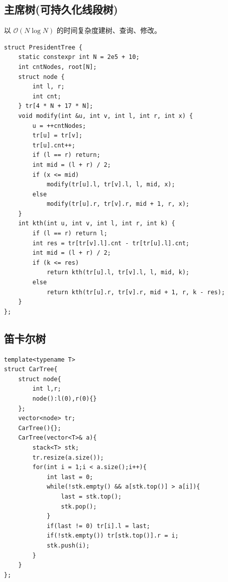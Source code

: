 \subsection{主席树(可持久化线段树)}
以 $\mathcal O(N\log N)$ 的时间复杂度建树、查询、修改。
\begin{lstlisting}[caption={}]
struct PresidentTree {
    static constexpr int N = 2e5 + 10;
    int cntNodes, root[N];
    struct node {
        int l, r;
        int cnt;
    } tr[4 * N + 17 * N];
    void modify(int &u, int v, int l, int r, int x) {
        u = ++cntNodes;
        tr[u] = tr[v];
        tr[u].cnt++;
        if (l == r) return;
        int mid = (l + r) / 2;
        if (x <= mid)
            modify(tr[u].l, tr[v].l, l, mid, x);
        else
            modify(tr[u].r, tr[v].r, mid + 1, r, x);
    }
    int kth(int u, int v, int l, int r, int k) {
        if (l == r) return l;
        int res = tr[tr[v].l].cnt - tr[tr[u].l].cnt;
        int mid = (l + r) / 2;
        if (k <= res)
            return kth(tr[u].l, tr[v].l, l, mid, k);
        else
            return kth(tr[u].r, tr[v].r, mid + 1, r, k - res);
    }
};
\end{lstlisting}



\subsection{笛卡尔树}
\begin{lstlisting}[caption={}]
template<typename T>
struct CarTree{
	struct node{
		int l,r;
		node():l(0),r(0){}
	};
	vector<node> tr;
	CarTree(){};
	CarTree(vector<T>& a){
		stack<T> stk;
		tr.resize(a.size());
		for(int i = 1;i < a.size();i++){
			int last = 0;
			while(!stk.empty() && a[stk.top()] > a[i]){
				last = stk.top();
				stk.pop();
			}
			if(last != 0) tr[i].l = last;
			if(!stk.empty()) tr[stk.top()].r = i;
			stk.push(i);
		}
	}
};
\end{lstlisting}

